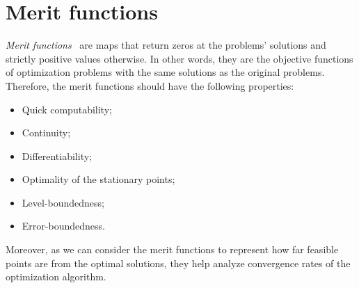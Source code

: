 \documentclass[../../main]{subfiles}
\begin{document}
\section{Merit functions} 
\emph{Merit functions}~\cite{Fukushima1996} are maps that return zeros at the problems' solutions and strictly positive values otherwise.
In other words, they are the objective functions of optimization problems with the same solutions as the original problems.
Therefore, the merit functions should have the following properties:
\begin{itemize}
    \item Quick computability;
    \item Continuity;
    \item Differentiability;
    \item Optimality of the stationary points;
    \item Level-boundedness;
    \item Error-boundedness.
\end{itemize}
Moreover, as we can consider the merit functions to represent how far feasible points are from the optimal solutions, they help analyze convergence rates of the optimization algorithm.




\end{document}
